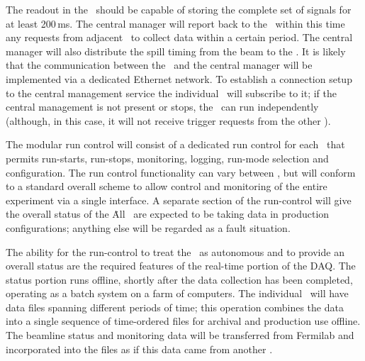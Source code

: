The readout in the \COMPARTMENTS\ should be capable of storing the
complete set of signals for at least 200\,ms.  The central manager
will report back to the \COMPARTMENTS\ within this time any requests
from adjacent \COMPARTMENTS\ to collect data within a certain period.
The central manager will also distribute the spill timing from the
beam to the \COMPARTMENTS.  It is likely that the
communication between the \COMPARTMENTS\ and the central manager will be
implemented via a dedicated Ethernet network.%
To establish a connection setup to the central management service
the individual \COMPARTMENT\ will subscribe to it; if the central management is not present
or stops, the \COMPARTMENT\ can run independently (although, in this case,
it will not receive trigger requests from the other \COMPARTMENTS).  

The 
modular run control will consist of a dedicated run control for each
\COMPARTMENT\ that permits run-starts, run-stops, monitoring, logging,
run-mode selection and configuration.  The run control functionality can
vary between \COMPARTMENTS, but will conform to a
standard overall scheme to allow %
control and monitoring of the entire experiment via a single interface.
A separate section of the
run-control will give the overall status of the \COMPARTMENTS\. All
\COMPARTMENTS\ are expected to be taking data in production configurations; anything else will be regarded as a fault situation. 

The ability for the run-control to treat the \COMPARTMENTS\ as
autonomous and to provide an overall status are the required features of the
real-time portion of the DAQ.
The status portion %
runs offline, shortly after the data collection has been
completed, operating as a batch system on a farm of
computers.  The individual \COMPARTMENTS\
will have data files spanning different periods of time; this operation combines
the data into
a single sequence of time-ordered files for archival and production
use offline.  The beamline status and monitoring data will be
transferred from Fermilab and incorporated into the files as if this data 
came from another \COMPARTMENT.